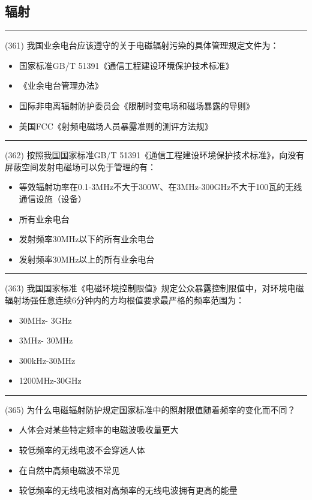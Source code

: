 \documentclass[twocolumn,hyperref,UTF8]{ctexart}  %
\begin{document}
\clearpage
\subsection{辐射}


\noindent\rule{0.5\textwidth}{1pt}
\heiti (361) 我国业余电台应该遵守的关于电磁辐射污染的具体管理规定文件为：  \songti {\color{gray} [LK1002] }
\begin{itemize}
	\item  国家标准GB/T 51391《通信工程建设环境保护技术标准》
	\item  《业余电台管理办法》
	\item  国际非电离辐射防护委员会《限制时变电场和磁场暴露的导则》
	\item  美国FCC《射频电磁场人员暴露准则的测评方法规》
\end{itemize}


\noindent\rule{0.5\textwidth}{1pt}
\heiti (362) 按照我国国家标准GB/T 51391《通信工程建设环境保护技术标准》，向没有屏蔽空间发射电磁场可以免于管理的有：  \songti {\color{gray} [LK1003] }
\begin{itemize}
	\item  等效辐射功率在0.1-3MHz不大于300W、在3MHz-300GHz不大于100瓦的无线通信设施（设备） 
	\item  所有业余电台
	\item  发射频率30MHz以下的所有业余电台
	\item  发射频率30MHz以上的所有业余电台
\end{itemize}


\noindent\rule{0.5\textwidth}{1pt}
\heiti (363) 我国国家标准《电磁环境控制限值》规定公众暴露控制限值中，对环境电磁辐射场强任意连续6分钟内的方均根值要求最严格的频率范围为：  \songti {\color{gray} [LK1009] }
\begin{itemize}
	\item  30MHz- 3GHz
	\item  3MHz- 30MHz
	\item  300kHz-30MHz
	\item  1200MHz-30GHz
\end{itemize}


\noindent\rule{0.5\textwidth}{1pt}
\heiti (365) 为什么电磁辐射防护规定国家标准中的照射限值随着频率的变化而不同？ \songti {\color{gray} [LK1236] }
\begin{itemize}
	\item  人体会对某些特定频率的电磁波吸收量更大
	\item  较低频率的无线电波不会穿透人体
	\item  在自然中高频电磁波不常见
	\item  较低频率的无线电波相对高频率的无线电波拥有更高的能量
\end{itemize}
\end{document}
